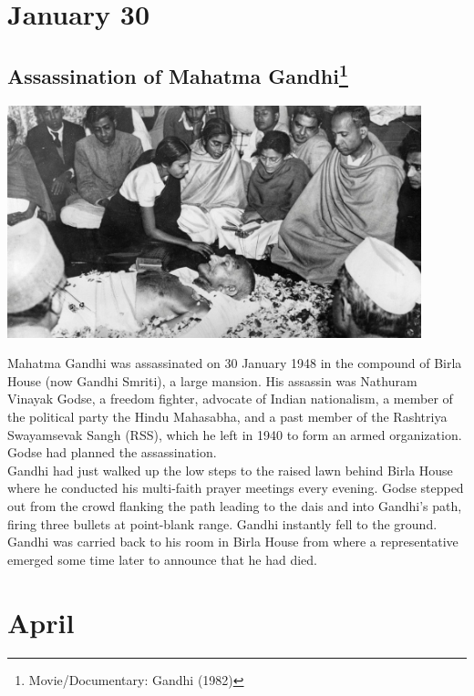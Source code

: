 \documentclass[11pt]{report}
\begin{document}
\section{January 30}
\subsection{Assassination of Mahatma Gandhi\protect\footnote{Movie/Documentary: Gandhi (1982)}}
\vspace{2mm}\begin{center}\includegraphics[width=12cm]{./img/gandhiDead.jpg}\end{center}
Mahatma Gandhi was assassinated on 30 January 1948 in the compound of Birla House (now Gandhi Smriti), a large mansion. His assassin was Nathuram Vinayak Godse, a freedom fighter, advocate of Indian nationalism, a member of the political party the Hindu Mahasabha, and a past member of the Rashtriya Swayamsevak Sangh (RSS), which he left in 1940 to form an armed organization. Godse had planned the assassination.\\
\indent Gandhi had just walked up the low steps to the raised lawn behind Birla House where he conducted his multi-faith prayer meetings every evening. Godse stepped out from the crowd flanking the path leading to the dais and into Gandhi's path, firing three bullets at point-blank range. Gandhi instantly fell to the ground. Gandhi was carried back to his room in Birla House from where a representative emerged some time later to announce that he had died.
\section{April}
\end{document}
